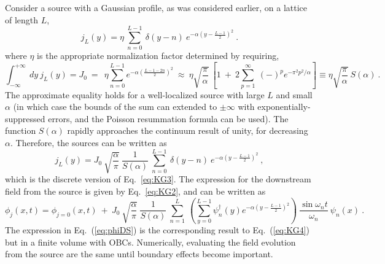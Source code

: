 \documentclass[aps, prc, tightenlines,superscriptaddress, letterpaper, amsmath, amssymb, preprintnumbers, floatfix, longbibliography, nofootinbib]{revtex4-2}
\begin{document}
Consider a source with a Gaussian profile, as was considered earlier, 
on a lattice of length $L$,
%
\begin{equation}
j_L(y) = \eta\ \sum_{n=0}^{L-1}\ \delta (y-n)\ e^{-\alpha (y - \frac{L-1}{2})^2} \ .
    \label{eq:jy}
\end{equation}
%
where $\eta$ is the appropriate normalization factor determined by requiring,
%
\begin{equation}
\int_{-\infty}^{+\infty}\ dy\ j_L(y) = J_0
 \ = \ \
 \eta \sum_{n=0}^{L-1} e^{-\alpha \left (\frac{L-1-2n}{2}\right )^2 } 
 \ \approx \ \eta \sqrt{\frac{\pi}{\alpha}}\ \left[
1\ +\ 2\sum_{p=1}^\infty\ (-)^p e^{-\pi^2 p^2/\alpha} \right]
 \equiv 
\eta \sqrt{\frac{\pi}{\alpha}}\  S(\alpha) \ .
    \label{eq:jyb}
\end{equation}
%
The approximate equality holds for a well-localized source with large $L$ and small $\alpha$ (in which case the bounds of the sum can extended to $\pm\infty$ with exponentially-suppressed errors, and the Poisson resummation formula can be used).
The function $S(\alpha)$ rapidly approaches the continuum result of unity, for decreasing $\alpha$.
Therefore, the sources can be written as
%
\begin{equation}
j_L(y) = J_0\ \sqrt{\frac{\alpha}{\pi}}\ \frac{1}{S(\alpha)}\ 
\sum_{n=0}^{L-1}\ \delta (y-n)\ e^{-\alpha (y - \frac{L-1}{2})^2} \ ,
    \label{eq:jyc}
\end{equation}
%
which is the discrete version of Eq.~\eqref{eq:KG3}.
The expression for the downstream field from the source is given by Eq.~\eqref{eq:KG2}, and can be written as
%
\begin{equation}
    \phi_j(x,t) = \phi_{j=0}(x,t) 
    \ +\ 
    J_0\ \sqrt{\frac{\alpha}{\pi}}\ \frac{1}{S(\alpha)}\ 
    \sum_{n=1}^L\ 
    \left(
    \sum_{y=0}^{L-1} \psi_n^\dagger(y)
    e^{-\alpha (y - \frac{L-1}{2})^2}
    \right)
    \ \frac{\sin \omega_n t}{\omega_n}\ 
    \psi_n(x) \ .
    \label{eq:phiDS}
\end{equation}
%
The expression in Eq.~(\ref{eq:phiDS}) is the corresponding result to Eq.~(\ref{eq:KG4}) but in a finite volume with OBCs.
Numerically, evaluating the field evolution from the source are the same until boundary effects become important.




\FloatBarrier
\end{document}
